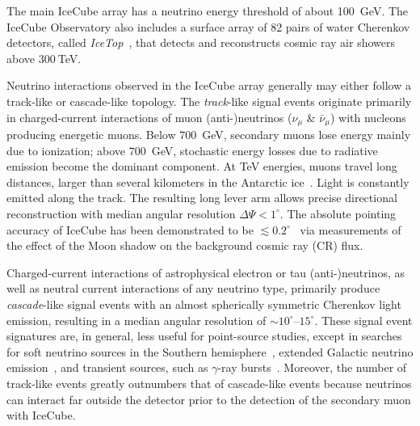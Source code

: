 \documentclass[aps,10pt,prd,twocolumn,floats,letterpaper,showpacs,nofootinbib,bibnotes,notitlepage,superscriptaddress,floatfix]{revtex4-1}
\begin{document}
The main IceCube array has a neutrino energy threshold of about 100~GeV. The IceCube Observatory also includes a surface array of 82 pairs of water Cherenkov detectors, called \emph{IceTop}~\cite{IceCube:2012nn}, that detects and reconstructs cosmic ray air showers above $300\:$TeV. 

Neutrino interactions observed in the IceCube array generally may either follow a track-like or cascade-like topology. The \emph{track}-like signal events originate primarily in charged-current interactions of muon (anti-)neutrinos ($\nu_\mu$ \& $\bar{\nu}_\mu$) with nucleons producing energetic muons. Below $700$~GeV, secondary muons lose energy mainly due to ionization; above $700$~GeV, stochastic energy losses due to radiative emission become the dominant component. At TeV energies, muons travel long distances, larger than several kilometers in the Antarctic ice~\cite{Chirkin:2004hz}. Light is constantly emitted along the track. The resulting long lever arm allows precise directional reconstruction with median angular resolution $\Delta\Psi<1^\circ$. The absolute pointing accuracy of IceCube has been demonstrated to be $\lesssim0.2^\circ$~\cite{Aartsen:2013zka} via measurements of the effect of the Moon shadow on the background cosmic ray (CR) flux. 

Charged-current interactions of astrophysical electron or tau (anti-)neutrinos, as well as neutral current interactions of any neutrino type, primarily produce \emph{cascade}-like signal events with an almost spherically symmetric Cherenkov light emission, resulting in a median angular resolution of $\sim10^\circ$--$15^\circ$\cite{Aartsen:2017eiu}. These signal event signatures are, in general, less useful for point-source studies, except in searches for soft neutrino sources in the Southern hemisphere~\cite{Aartsen:2019epb}, extended Galactic neutrino emission~\cite{Aartsen:2019epb}, and transient sources, such as $\gamma$-ray bursts~\cite{Aartsen:2016qcr}. Moreover, the number of track-like events greatly outnumbers that of cascade-like events because neutrinos can interact far outside the detector prior to the detection of the secondary muon with IceCube.  
\end{document}

